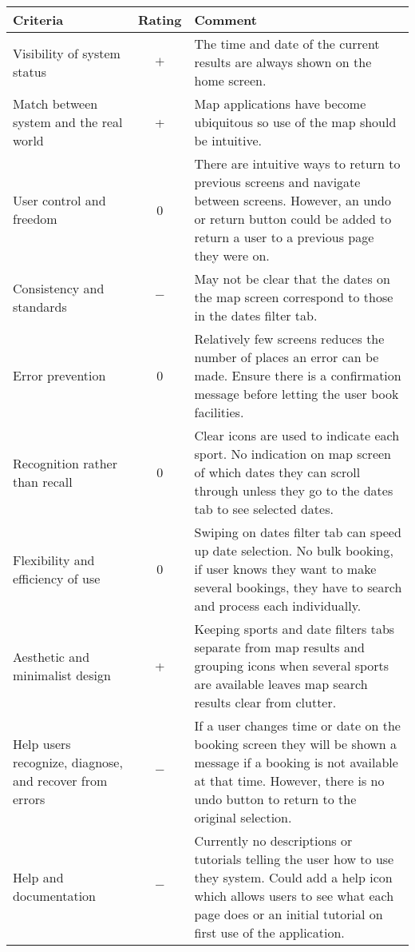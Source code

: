 \begin{center}
	\renewcommand{\arraystretch}{2}
	\begin{longtable}{p{} c p{}}
		\toprule
		\textbf{Criteria} & \textbf{Rating} & \textbf{Comment}\\
		\midrule
		Visibility of system status & $+$ & The time and date of the current
		results are always shown on the home screen.\\

		Match between system and the real world & + & Map applications have
		become ubiquitous so use of the map should be intuitive.\\

		User control and freedom & 0 & There are intuitive ways to return to
		previous screens and navigate between screens. However, an undo or
		return button could be added to return a user to a previous page they
		were on.\\

		Consistency and standards & $-$ & May not be clear that the dates on
		the map screen correspond to those in the dates filter tab.\\

		Error prevention & 0 & Relatively few screens reduces the number of
		places an error can be made. Ensure there is a confirmation message
		before letting the user book facilities.\\

		Recognition rather than recall & 0 & Clear icons are used to indicate
		each sport. No indication on map screen of which dates they can scroll
		through unless they go to the dates tab to see selected dates.\\

		Flexibility and efficiency of use & 0 & Swiping on dates filter tab can
		speed up date selection. No bulk booking, if user knows they want to
		make several bookings, they have to search and process each
		individually. \\

		Aesthetic and minimalist design & + & Keeping sports and date filters
		tabs separate from map results and grouping icons when several sports
		are available leaves map search results clear from clutter.\\

		Help users recognize, diagnose, and recover from errors & $-$ & If a
		user changes time or date on the booking screen they will be shown a
		message if a booking is not available at that time. However, there is
		no undo button to return to the original selection.\\

		Help and documentation & $-$ & Currently no descriptions or tutorials
		telling the user how to use they system. Could add a help icon which
		allows users to see what each page does or an initial tutorial on first
		use of the application.\\
		\bottomrule
	\end{longtable}
\end{center}

